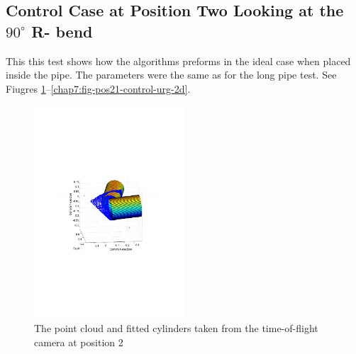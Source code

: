 \subsection{Control Case at Position Two Looking at the $90^\circ$ R- bend}
This this test shows how the algorithms preforms in the ideal case when placed inside the
pipe. The parameters were the same as for the long pipe test. See Fiugres
\ref{chap7:fig-pos21-control-tof-3d}--\ref{chap7:fig-pos21-control-urg-2d}.
\begin{figure}[htbp]
    \centering
    \includegraphics[width=0.5\textwidth]{pics/pos21-control-tof-3d}
    \caption{The point cloud and fitted cylinders taken from the time-of-flight camera at
    position 2}
    \label{chap7:fig-pos21-control-tof-3d}
\end{figure}
